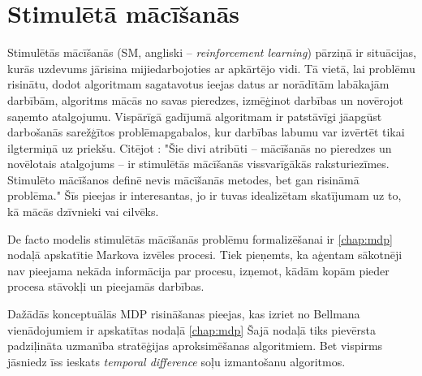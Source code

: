 \documentclass{ludis} %
\begin{document}

\chapter{Stimulētā mācīšanās} \label{chap:stim}
Stimulētās mācīšanās (SM, angliski -- \textit{reinforcement learning}) pārziņā
ir situācijas, kurās uzdevums jārisina mijiedarbojoties ar apkārtējo vidi. Tā
vietā, lai problēmu risinātu, dodot algoritmam sagatavotus ieejas datus ar
norādītām labākajām darbībām, algoritms mācās no savas pieredzes, izmēģinot
darbības un novērojot saņemto atalgojumu. Vispārīgā gadījumā algoritmam ir
patstāvīgi jāapgūst darbošanās sarežģītos problēmapgabalos, kur darbības labumu
var izvērtēt tikai ilgtermiņā uz priekšu. Citējot \citet{Barto}: "Šie divi
atribūti -- mācīšanās no pieredzes un novēlotais atalgojums -- ir stimulētās
mācīšanās vissvarīgākās raksturiezīmes. Stimulēto mācīšanos definē nevis
mācīšanās metodes, bet gan risināmā problēma." Šīs pieejas ir interesantas, jo
ir tuvas idealizētam skatījumam uz to, kā mācās dzīvnieki vai cilvēks.

De facto modelis stimulētās mācīšanās problēmu formalizēšanai ir \ref{chap:mdp}
nodaļā apskatītie Markova izvēles procesi. Tiek pieņemts, ka aģentam sākotnēji
nav pieejama nekāda informācija par procesu, izņemot, kādām kopām pieder procesa
stāvokļi un pieejamās darbības.

Dažādās konceptuālās MDP risināšanas pieejas, kas izriet no Bellmana
vienādojumiem ir apskatītas nodaļā \ref{chap:mdp} Šajā nodaļā tiks pievērsta
padziļināta uzmanība stratēģijas aproksimēšanas algoritmiem. Bet vispirms
jāsniedz īss ieskats \textit{temporal difference} soļu izmantošanu algoritmos.
\end{document}
